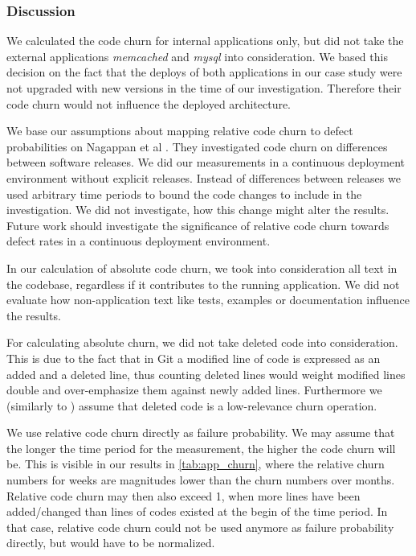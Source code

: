 \subsubsection{Discussion}

We calculated the code churn for internal applications only, but did not take the external applications \emph{memcached} and \emph{mysql} into consideration. We based this decision on the fact that the deploys of both applications in our case study were not upgraded with new versions in the time of our investigation. Therefore their code churn would not influence the deployed architecture.

We base our assumptions about mapping relative code churn to defect probabilities on Nagappan et al \cite{Nagappan2005}. They investigated code churn on differences between software releases. We did our measurements in a continuous deployment environment without explicit releases. Instead of differences between releases we used arbitrary time periods to bound the code changes to include in the investigation. We did not investigate, how this change might alter the results. Future work should investigate the significance of relative code churn towards defect rates in a continuous deployment environment.

In our calculation of absolute code churn, we took into consideration all text in the codebase, regardless if it contributes to the running application. We did not evaluate how non-application text like tests, examples or documentation influence the results.

For calculating absolute churn, we did not take deleted code into consideration. This is due to the fact that in Git a modified line of code is expressed as an added and a deleted line, thus counting deleted lines would weight modified lines double and over-emphasize them against newly added lines. Furthermore we (similarly to \cite{KaidencePost}) assume that deleted code is a low-relevance churn operation.

We use relative code churn directly as failure probability. We may assume that the longer the time period for the measurement, the higher the code churn will be. This is visible in our results in \autoref{tab:app_churn}, where the relative churn numbers for weeks are magnitudes lower than the churn numbers over months. Relative code churn may then also exceed 1, when more lines have been added/changed than lines of codes existed at the begin of the time period. In that case, relative code churn could not be used anymore as failure probability directly, but would have to be normalized.

